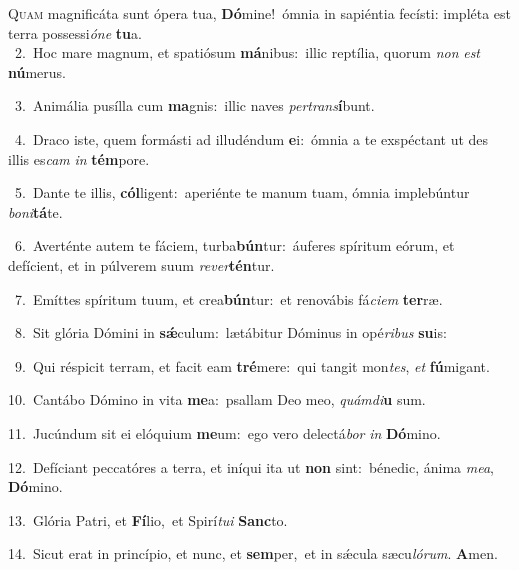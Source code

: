 \lettrine{\initial\textcolor{\initialcolor}{Q}}{uam} magnificáta sunt ópera tua, \textbf{Dó}\-mine!~\star ómnia in sapiéntia fecísti: impléta est terra possessi\-\textit{ó}\-\textit{ne} \textbf{tu}\-a.\\
{\numbfont\textcolor{\numbcolor}{~2.}}~Hoc mare magnum, et spatiósum \textbf{má}\-nibus:~\star illic reptília, quorum \textit{non} \textit{est} \textbf{nú}\-merus.\par
{\numbfont\textcolor{\numbcolor}{~3.}}~Animália pusílla cum \textbf{ma}\-gnis:~\star illic naves \textit{per}\-\textit{trans}\textbf{í}bunt.\par
{\numbfont\textcolor{\numbcolor}{~4.}}~Draco iste, quem formásti ad illudéndum \textbf{e}\-i:~\star ómnia a te exspéctant ut des illis es\textit{cam} \textit{in} \textbf{tém}\-pore.\par
{\numbfont\textcolor{\numbcolor}{~5.}}~Dante te illis, \textbf{cól}\-ligent:~\star aperiénte te manum tuam, ómnia implebúntur \textit{bo}\-\textit{ni}\textbf{tá}te.\par
{\numbfont\textcolor{\numbcolor}{~6.}}~Averténte autem te fáciem, turba\-\textbf{bún}\-tur:~\star áuferes spíritum eórum, et defícient, et in púlverem suum \textit{re}\-\textit{ver}\textbf{tén}tur.\par
{\numbfont\textcolor{\numbcolor}{~7.}}~Emíttes spíritum tuum, et crea\-\textbf{bún}\-tur:~\star et renovábis fá\-\textit{ci}\-\textit{em} \textbf{ter}\-ræ.\par
{\numbfont\textcolor{\numbcolor}{~8.}}~Sit glória Dómini in \textbf{sǽ}\-culum:~\star lætábitur Dóminus in opé\-\textit{ri}\-\textit{bus} \textbf{su}\-is:\par
{\numbfont\textcolor{\numbcolor}{~9.}}~Qui réspicit terram, et facit eam \textbf{tré}\-mere:~\star qui tangit mon\-\textit{tes}\-, \textit{et} \textbf{fú}\-migant.\par
{\numbfont\textcolor{\numbcolor}{10.}}~Cantábo Dómino in vita \textbf{me}\-a:~\star psallam Deo meo, \textit{quám}\-\textit{di}\textbf{u} sum.\par
{\numbfont\textcolor{\numbcolor}{11.}}~Jucúndum sit ei elóquium \textbf{me}\-um:~\star ego vero delectá\textit{bor} \textit{in} \textbf{Dó}\-mino.\par
{\numbfont\textcolor{\numbcolor}{12.}}~Defíciant peccatóres a terra, et iníqui ita ut \textbf{non} sint:~\star bénedic, ánima \textit{me}\-\textit{a}, \textbf{Dó}\-mino.\par
{\numbfont\textcolor{\numbcolor}{13.}}~Glória Patri, et \textbf{Fí}\-lio,~\star et Spirí\-\textit{tu}\-\textit{i} \textbf{Sanc}\-to.\par
{\numbfont\textcolor{\numbcolor}{14.}}~Sicut erat in princípio, et nunc, et \textbf{sem}\-per,~\star et in sǽcula sæcu\-\textit{ló}\-\textit{rum}. \textbf{A}\-men.\par
